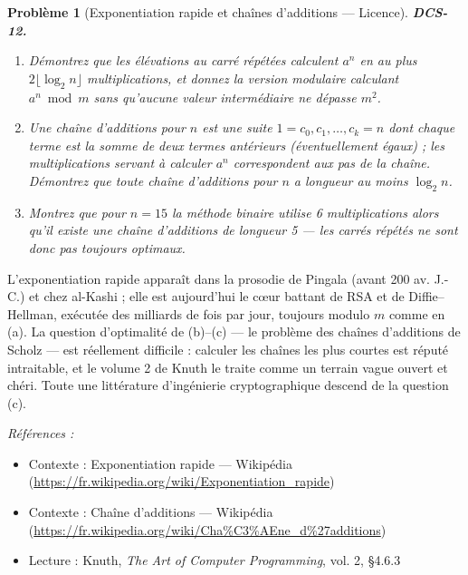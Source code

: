 \documentclass[11pt]{article}
\newtheorem{problem}{Problème}
\newenvironment{refs}{\par\small\noindent\emph{Références :}\begin{itemize}\setlength\itemsep{0pt}}{\end{itemize}\normalsize}
\begin{document}
\begin{problem}[{Exponentiation rapide et chaînes d'additions --- Licence}]
\textbf{DCS-12.} \begin{enumerate}
\item[(a)] Démontrez que les élévations au carré répétées calculent $a^n$ en au plus $2\lfloor \log_2 n \rfloor$ multiplications, et donnez la version modulaire calculant $a^n \bmod m$ sans qu'aucune valeur intermédiaire ne dépasse $m^2$.
\item[(b)] Une \textit{chaîne d'additions} pour $n$ est une suite $1 = c_0, c_1, \dots, c_k = n$ dont chaque terme est la somme de deux termes antérieurs (éventuellement égaux) ; les multiplications servant à calculer $a^n$ correspondent aux pas de la chaîne. Démontrez que toute chaîne d'additions pour $n$ a longueur au moins $\log_2 n$.
\item[(c)] Montrez que pour $n = 15$ la méthode binaire utilise 6 multiplications alors qu'il existe une chaîne d'additions de longueur 5 --- les carrés répétés ne sont donc pas toujours optimaux.
\end{enumerate}

\end{problem}

\noindent L'exponentiation rapide apparaît dans la prosodie de Pingala (avant 200 av. J.-C.) et chez al-Kashi ; elle est aujourd'hui le c\oe{}ur battant de RSA et de Diffie--Hellman, exécutée des milliards de fois par jour, toujours modulo $m$ comme en (a). La question d'optimalité de (b)--(c) --- le problème des chaînes d'additions de Scholz --- est réellement difficile : calculer les chaînes les plus courtes est réputé intraitable, et le volume 2 de Knuth le traite comme un terrain vague ouvert et chéri. Toute une littérature d'ingénierie cryptographique descend de la question (c).

\begin{refs}
\item Contexte : Exponentiation rapide --- Wikipédia (\url{https://fr.wikipedia.org/wiki/Exponentiation_rapide})
\item Contexte : Chaîne d'additions --- Wikipédia (\url{https://fr.wikipedia.org/wiki/Cha%C3%AEne_d%27additions})
\item Lecture : Knuth, \textit{The Art of Computer Programming}, vol. 2, \S{}4.6.3
\end{refs}

\bigskip
\end{document}
